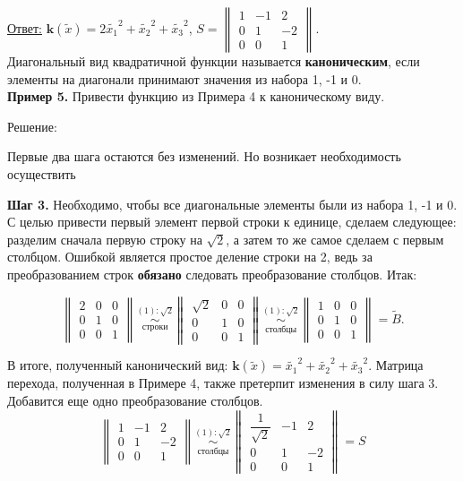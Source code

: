 \underline{Ответ:} $\mathbf{k}(\widetilde{x})=2\widetilde{x_1}^2+\widetilde{x_2}^2+\widetilde{x_3}^2$, $S=\begin{Vmatrix}
1 & -1 & 2 \\
0 & 1 & -2 \\
0 & 0 & 1
\end{Vmatrix}$.\\

Диагональный вид квадратичной функции называется \textbf{каноническим}, если элементы на диагонали принимают значения из набора 1, -1 и 0.\\

\textbf{Пример 5.} Привести функцию из Примера 4 к каноническому виду.

\begin{center}
Решение:
\end{center}

Первые два шага остаются без изменений. Но возникает необходимость осуществить

\textbf{Шаг 3.} Необходимо, чтобы все диагональные элементы были из набора 1, -1 и 0. С целью привести первый элемент первой строки к единице, сделаем следующее: разделим сначала первую строку на $\sqrt{2}$, а затем то же самое сделаем с первым столбцом. Ошибкой является простое деление строки на 2, ведь за преобразованием строк \textbf{обязано} следовать преобразование столбцов. Итак:

$$\begin{Vmatrix}
2 & 0 & 0 \\
0 & 1 & 0 \\
0 & 0 & 1
\end{Vmatrix} \underset{\text{строки}}{\overset{(1):\sqrt{2}}{ \sim}} \begin{Vmatrix}
\sqrt{2} & 0 & 0 \\
0 & 1 & 0 \\
0 & 0 & 1
\end{Vmatrix} \underset{\text{столбцы}}{\overset{(1):\sqrt{2}}{ \sim}} \begin{Vmatrix}
1 & 0 & 0 \\
0 & 1 & 0 \\
0 & 0 & 1
\end{Vmatrix} =\widetilde{B}. $$

В итоге, полученный канонический вид: $\mathbf{k}(\widetilde{x})=\widetilde{x_1}^2+\widetilde{x_2}^2+\widetilde{x_3}^2$.
Матрица перехода, полученная в Примере 4, также претерпит изменения в силу шага 3. Добавится еще одно преобразование столбцов.
$$\begin{Vmatrix}
1 & -1 & 2 \\
0 & 1 & -2 \\
0 & 0 & 1
\end{Vmatrix}\underset{\text{столбцы}}{\overset{(1):\sqrt{2}}{ \sim}} \begin{Vmatrix}
\dfrac{1}{\sqrt{2}} & -1 & 2 \\
0 & 1 & -2 \\
0 & 0 & 1
\end{Vmatrix}=S$$

